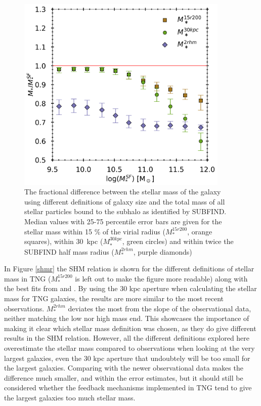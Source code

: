 \begin{figure}
    \centering
    \includegraphics[width=0.9\textwidth]{images/SM_fSM.png}
    \caption{The fractional difference between the stellar mass of the galaxy using different definitions of galaxy size and the total mass of all stellar particles bound to the subhalo as identified by SUBFIND. Median values with 25-75 percentile error bars are given for the stellar mass within 15 \% of the virial radius ($M_\ast^{15r200}$, orange squares), within 30$\,$ kpc ($M_\ast^{30kpc}$, green circles) and within twice the SUBFIND half mass radius ($M_\ast^{2rhm}$, purple diamonds)}
    \label{SM_fSM}
\end{figure}


In Figure \ref{shmr} the SHM relation is shown for the different definitions of stellar mass in TNG ($M_\ast^{15r200}$ is left out to make the figure more readable) along with the best fits from \textcite{Behroozi2013} and \textcite{Zanisi2019}. By using the 30 kpc aperture when calculating the stellar mass for TNG galaxies, the results are more similar to the most recent observations. $M_\ast^{2rhm}$ deviates the most from the slope of the observational data, neither matching the low nor high mass end. This showcases the importance of making it clear which stellar mass definition was chosen, as they do give different results in the SHM relation. However, all the different definitions explored here overestimate the stellar mass compared to observations when looking at the very largest galaxies, even the 30 kpc aperture that undoubtely will be too small for the largest galaxies. Comparing with the newer observational data makes the difference much smaller, and within the error estimates, but it should still be considered whether the feedback mechanisms implemented in TNG tend to give the largest galaxies too much stellar mass. 

